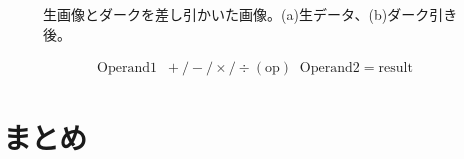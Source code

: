     \begin{figure}
	    \centering
    	\caption[生画像とダークを差し引いた画像]{生画像とダークを差し引かいた画像。(a)生データ、(b)ダーク引き後。}
    	\label{fig_4_6}
    \end{figure}
    \begin{align*}
    \mathrm{Operand1}\mspace{10mu}+/-/\times/\div(\mathrm{op})\mspace{10mu} \mathrm{Operand}2 = \mathrm{result}
    \end{align*}
\section*{まとめ}
    
    
    